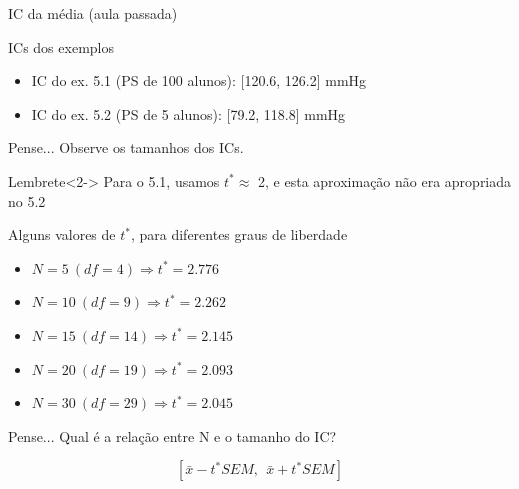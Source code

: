 \documentclass{beamer}
\begin{document}


\begin{frame}{IC da média (aula passada)}
  \begin{exampleblock}{ICs dos exemplos}
    \begin{itemize}
    \item IC do ex. 5.1 (PS de 100 alunos): [120.6, 126.2] mmHg
    \item IC do ex. 5.2 (PS de   5 alunos): [79.2, 118.8] mmHg
    \end{itemize}
  \end{exampleblock}
  \begin{block}{Pense...}
    Observe os tamanhos dos ICs.
  \end{block}
  \begin{block}{Lembrete}<2->
    Para o 5.1, usamos $t^{*} \approx$ 2, e esta aproximação não era apropriada no 5.2
  \end{block}

\end{frame}

\begin{frame}{Alguns valores de $t^{*}$, para diferentes graus de liberdade}
  \begin{itemize}
  \item $N = 5\ (df = 4) \Rightarrow t^{*} = 2.776$
  \item $N = 10\ (df = 9) \Rightarrow t^{*} = 2.262$
  \item $N = 15\ (df = 14) \Rightarrow t^{*} = 2.145$
  \item $N = 20\ (df = 19) \Rightarrow t^{*} = 2.093$
  \item $N = 30\ (df = 29) \Rightarrow t^{*} = 2.045$
  \end{itemize}
  \begin{block}{Pense...}
    Qual é a relação entre N e o tamanho do IC?

    \begin{displaymath}
      \left[ \bar{x} - t^{*} SEM,\ \ \bar{x} + t^{*} SEM \right]
    \end{displaymath}
  \end{block}
\end{frame}
\end{document}
